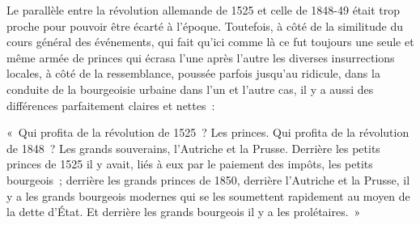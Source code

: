 \documentclass[french,twoside]{book} %
\newenvironment{quoteblock}%
  {\begin{quoting}}
  {\end{quoting}}
\newenvironment{quotebar}{%
    \def\FrameCommand{{\color{rubric!10!}\vrule width 0.5em} \hspace{0.9em}}%
    \def\OuterFrameSep{\itemsep} %
    \MakeFramed {\advance\hsize-\width \FrameRestore}
  }%
  {%
    \endMakeFramed
  }
\renewenvironment{quoteblock}%
  {%
    \savenotes
    \setstretch{0.9}
    \normalfont
    \begin{quotebar}
  }
  {%
    \end{quotebar}
    \spewnotes
  }
\begin{document}
Le parallèle entre la révolution allemande de 1525 et celle de 1848-49 était trop proche pour pouvoir être écarté à l’époque. Toutefois, à côté de la similitude du cours général des événements, qui fait qu’ici comme là ce fut toujours une seule et même armée de princes qui écrasa l’une après l’autre les diverses insurrections locales, à côté de la ressemblance, poussée parfois jusqu’au ridicule, dans la conduite de la bourgeoisie urbaine dans l’un et l’autre cas, il y a aussi des différences parfaitement claires et nettes :\par

\begin{quoteblock}
 \noindent « Qui profita de la révolution de 1525 ? Les princes. Qui profita de la révolution de 1848 ? Les grands souverains, l’Autriche et la Prusse. Derrière les petits princes de 1525 il y avait, liés à eux par le paiement des impôts, les petits bourgeois ; derrière les grands princes de 1850, derrière l’Autriche et la Prusse, il y a les grands bourgeois modernes qui se les soumettent rapidement au moyen de la dette d’État. Et derrière les grands bourgeois il y a les prolétaires. »
\end{quoteblock}
\end{document}
